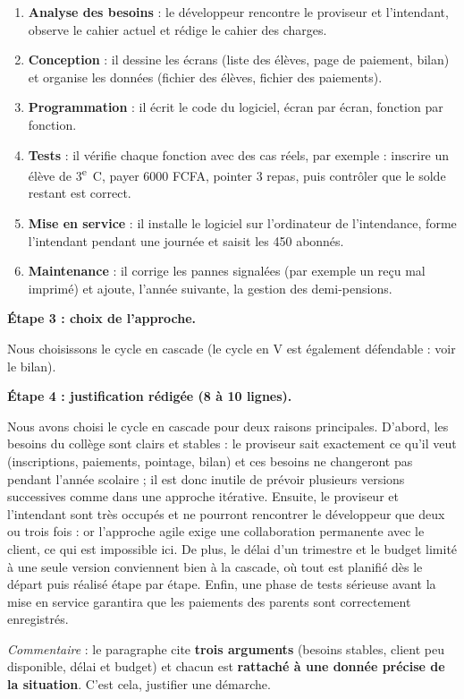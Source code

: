 \documentclass[11pt]{article}
\newcommand{\cle}[1]{{\popxbold\color{popdark}#1}}
\begin{document}
\begin{exoresolu}
\begin{enumerate}
  \item \textbf{Analyse des besoins} : le développeur rencontre le proviseur et l'intendant, observe le cahier actuel et rédige le cahier des charges.
  \item \textbf{Conception} : il dessine les écrans (liste des élèves, page de paiement, bilan) et organise les données (fichier des élèves, fichier des paiements).
  \item \textbf{Programmation} : il écrit le code du logiciel, écran par écran, fonction par fonction.
  \item \textbf{Tests} : il vérifie chaque fonction avec des cas réels, par exemple : inscrire un élève de 3\textsuperscript{e}~C, payer 6000 FCFA, pointer 3 repas, puis contrôler que le solde restant est correct.
  \item \textbf{Mise en service} : il installe le logiciel sur l'ordinateur de l'intendance, forme l'intendant pendant une journée et saisit les 450 abonnés.
  \item \textbf{Maintenance} : il corrige les pannes signalées (par exemple un reçu mal imprimé) et ajoute, l'année suivante, la gestion des demi-pensions.
\end{enumerate}

\textbf{Étape 3 : choix de l'approche.}

Nous choisissons le \cle{cycle en cascade} (le cycle en V est également défendable : voir le bilan).

\textbf{Étape 4 : justification rédigée (8 à 10 lignes).}

\og Nous avons choisi le cycle en cascade pour deux raisons principales. D'abord, les besoins du collège sont clairs et stables : le proviseur sait exactement ce qu'il veut (inscriptions, paiements, pointage, bilan) et ces besoins ne changeront pas pendant l'année scolaire ; il est donc inutile de prévoir plusieurs versions successives comme dans une approche itérative. Ensuite, le proviseur et l'intendant sont très occupés et ne pourront rencontrer le développeur que deux ou trois fois : or l'approche agile exige une collaboration permanente avec le client, ce qui est impossible ici. De plus, le délai d'un trimestre et le budget limité à une seule version conviennent bien à la cascade, où tout est planifié dès le départ puis réalisé étape par étape. Enfin, une phase de tests sérieuse avant la mise en service garantira que les paiements des parents sont correctement enregistrés. \fg

\emph{Commentaire} : le paragraphe cite \textbf{trois arguments} (besoins stables, client peu disponible, délai et budget) et chacun est \textbf{rattaché à une donnée précise de la situation}. C'est cela, justifier une démarche.
\end{exoresolu}
\end{document}
